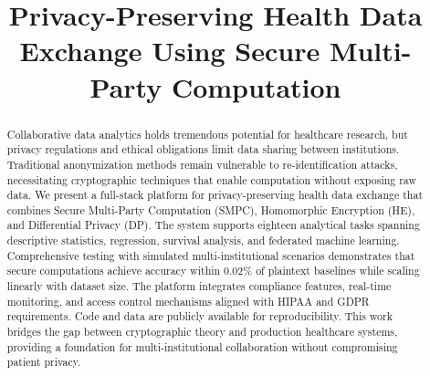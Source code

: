 \documentclass[conference]{IEEEtran}
\begin{document}
\title{Privacy-Preserving Health Data Exchange Using Secure Multi-Party Computation}

\author{
\and
{}
\and
{}
}

\maketitle

\begin{abstract}
Collaborative data analytics holds tremendous potential for healthcare research, but privacy regulations and ethical obligations limit data sharing between institutions. Traditional anonymization methods remain vulnerable to re-identification attacks, necessitating cryptographic techniques that enable computation without exposing raw data. We present a full-stack platform for privacy-preserving health data exchange that combines Secure Multi-Party Computation (SMPC), Homomorphic Encryption (HE), and Differential Privacy (DP). The system supports eighteen analytical tasks spanning descriptive statistics, regression, survival analysis, and federated machine learning. Comprehensive testing with simulated multi-institutional scenarios demonstrates that secure computations achieve accuracy within 0.02\% of plaintext baselines while scaling linearly with dataset size. The platform integrates compliance features, real-time monitoring, and access control mechanisms aligned with HIPAA and GDPR requirements. Code and data are publicly available for reproducibility. This work bridges the gap between cryptographic theory and production healthcare systems, providing a foundation for multi-institutional collaboration without compromising patient privacy.
\end{abstract}
\end{document}
